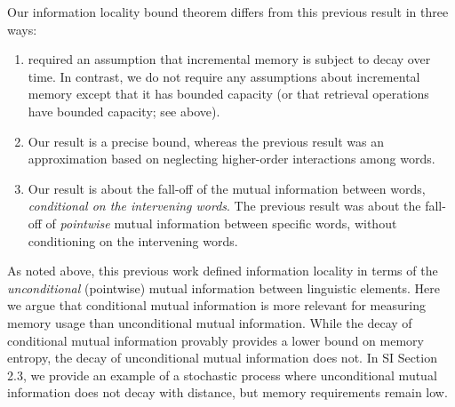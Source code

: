 Our information locality bound theorem differs from this previous result in three ways:
\begin{enumerate}
    \item \citet{futrell2020lossy} required an assumption that incremental memory is subject to decay over time. In contrast, we do not require any assumptions about incremental memory except that it has bounded capacity (or that retrieval operations have bounded capacity; see above).
    \item Our result is a precise bound, whereas the previous result was an approximation based on neglecting higher-order interactions among words.
    \item Our result is about the fall-off of the mutual information between words, \emph{conditional on the intervening words}. The previous result was about the fall-off of \emph{pointwise} mutual information between specific words, without conditioning on the intervening words.
\end{enumerate}

As noted above, this previous work defined information locality in terms of the \emph{unconditional} (pointwise) mutual information between linguistic elements.
Here we argue that conditional mutual information is more relevant for measuring memory usage than unconditional mutual information. 
While the decay of conditional mutual information provably provides a lower bound on memory entropy, the decay of unconditional mutual information does not.
In SI Section 2.3, we provide an example of a stochastic process where unconditional mutual information does not decay with distance, but memory requirements remain low.







